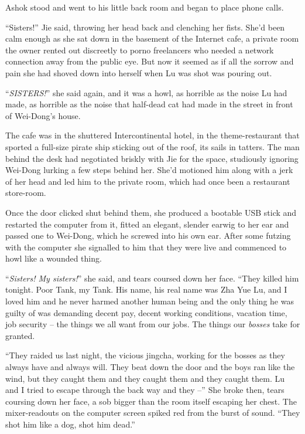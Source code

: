 Ashok stood and went to his little back room and began to place
phone calls.

\tb

``Sisters!'' Jie said, throwing her head back and clenching her
fists. She'd been calm enough as she sat down in the basement of
the Internet cafe, a private room the owner rented out discreetly
to porno freelancers who needed a network connection away from the
public eye. But now it seemed as if all the sorrow and pain she had
shoved down into herself when Lu was shot was pouring out.

``\emph{SISTERS!}'' she said again, and it was a howl, as horrible as
the noise Lu had made, as horrible as the noise that half-dead cat
had made in the street in front of Wei-Dong's house.

The cafe was in the shuttered Intercontinental hotel, in the
theme-restaurant that sported a full-size pirate ship sticking out
of the roof, its sails in tatters. The man behind the desk had
negotiated briskly with Jie for the space, studiously ignoring
Wei-Dong lurking a few steps behind her. She'd motioned him along
with a jerk of her head and led him to the private room, which had
once been a restaurant store-room.

Once the door clicked shut behind them, she produced a bootable USB
stick and restarted the computer from it, fitted an elegant,
slender earwig to her ear and passed one to Wei-Dong, which he
screwed into his own ear. After some futzing with the computer she
signalled to him that they were live and commenced to howl like a
wounded thing.

``\emph{Sisters! My sisters!}'' she said, and tears coursed down her
face. ``They killed him tonight. Poor Tank, my Tank. His name, his
real name was Zha Yue Lu, and I loved him and he never harmed
another human being and the only thing he was guilty of was
demanding decent pay, decent working conditions, vacation time, job
security -- the things we all want from our jobs. The things our
\emph{bosses} take for granted.

``They raided us last night, the vicious jingcha, working for the
bosses as they always have and always will. They beat down the door
and the boys ran like the wind, but they caught them and they
caught them and they caught them. Lu and I tried to escape through
the back way and they --'' She broke then, tears coursing down her
face, a sob bigger than the room itself escaping her chest. The
mixer-readouts on the computer screen spiked red from the burst of
sound. ``They shot him like a dog, shot him dead.''

